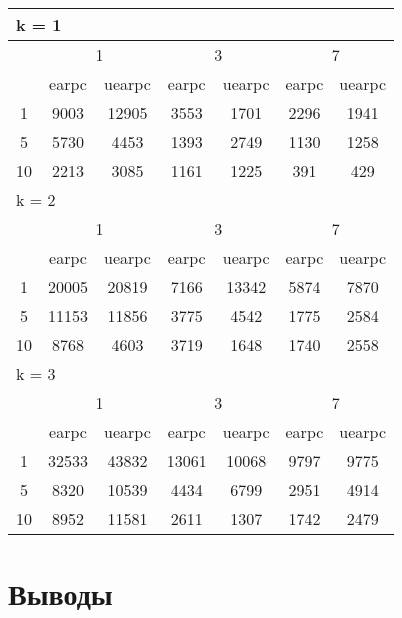 \begin{table}
 \begin{tabular}{|*7{c|}}
\hline
\multicolumn{7}{|l|}{k = 1} \\
\hline
\multirow{2}{*}{\diagbox{$\mu$}{$\lambda$}} & \multicolumn{2}{c|}{1} & \multicolumn{2}{c|}{3} & \multicolumn{2}{c|}{7} \\
\cline{2-7}
 & earpc & uearpc & earpc & uearpc & earpc & uearpc \\
\hline
1 & 9003 & 12905 & 3553 & 1701 & 2296 & 1941 \\
\hline
5 & 5730 & 4453 & 1393 & 2749 & 1130 & 1258 \\
\hline
10 & 2213 & 3085 & 1161 & 1225 & 391 & 429 \\
\hline
\multicolumn{7}{|l|}{k = 2} \\
\hline
\multirow{2}{*}{\diagbox{$\mu$}{$\lambda$}} & \multicolumn{2}{c|}{1} & \multicolumn{2}{c|}{3} & \multicolumn{2}{c|}{7} \\
\cline{2-7}
 & earpc & uearpc & earpc & uearpc & earpc & uearpc \\
\hline
1 & 20005 & 20819 & 7166 & 13342 & 5874 & 7870 \\
\hline
5 & 11153 & 11856 & 3775 & 4542 & 1775 & 2584 \\
\hline
10 & 8768 & 4603 & 3719 & 1648 & 1740 & 2558 \\
\hline
\multicolumn{7}{|l|}{k = 3} \\
\hline
\multirow{2}{*}{\diagbox{$\mu$}{$\lambda$}} & \multicolumn{2}{c|}{1} & \multicolumn{2}{c|}{3} & \multicolumn{2}{c|}{7} \\
\cline{2-7}
 & earpc & uearpc & earpc & uearpc & earpc & uearpc \\
\hline
1 & 32533 & 43832 & 13061 & 10068 & 9797 & 9775 \\
\hline
5 & 8320 & 10539 & 4434 & 6799 & 2951 & 4914 \\
\hline
10 & 8952 & 11581 & 2611 & 1307 & 1742 & 2479 \\
\hline
\end{tabular}
\end{table}


\section{Выводы}
